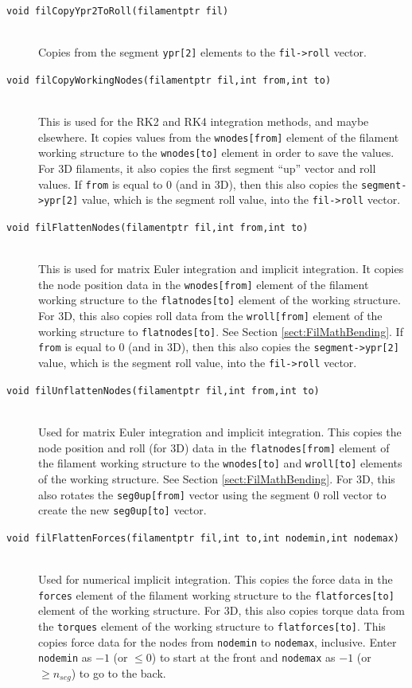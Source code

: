 \documentclass {scrbook}
\newcommand {\ttt} {\texttt}
\begin{document}
\begin{description}
\item[\ttt{void filCopyYpr2ToRoll(filamentptr fil)}]
\hfill \\
Copies from the segment \ttt{ypr[2]} elements to the \ttt{fil->roll} vector.


\item[\ttt{void filCopyWorkingNodes(filamentptr fil,int from,int to)}]
\hfill \\
This is used for the RK2 and RK4 integration methods, and maybe elsewhere. It copies values from the \ttt{wnodes[from]} element of the filament working structure to the \ttt{wnodes[to]} element in order to save the values. For 3D filaments, it also copies the first segment ``up'' vector and roll values. If \ttt{from} is equal to 0 (and in 3D), then this also copies the \ttt{segment->ypr[2]} value, which is the segment roll value, into the \ttt{fil->roll} vector.

\item[\ttt{void filFlattenNodes(filamentptr fil,int from,int to)}]
\hfill \\
This is used for matrix Euler integration and implicit integration. It copies the node position data in the \ttt{wnodes[from]} element of the filament working structure to the \ttt{flatnodes[to]} element of the working structure. For 3D, this also copies roll data from the \ttt{wroll[from]} element of the working structure to \ttt{flatnodes[to]}. See Section \ref{sect:FilMathBending}. If \ttt{from} is equal to 0 (and in 3D), then this also copies the \ttt{segment->ypr[2]} value, which is the segment roll value, into the \ttt{fil->roll} vector.

\item[\ttt{void filUnflattenNodes(filamentptr fil,int from,int to)}]
\hfill \\
Used for matrix Euler integration and implicit integration. This copies the node position and roll (for 3D) data in the \ttt{flatnodes[from]} element of the filament working structure to the \ttt{wnodes[to]} and \ttt{wroll[to]} elements of the working structure. See Section \ref{sect:FilMathBending}. For 3D, this also rotates the \ttt{seg0up[from]} vector using the segment 0 roll vector to create the new \ttt{seg0up[to]} vector.

\item[\ttt{void filFlattenForces(filamentptr fil,int to,int nodemin,int nodemax)}]
\hfill \\
Used for numerical implicit integration. This copies the force data in the \ttt{forces} element of the filament working structure to the \ttt{flatforces[to]} element of the working structure. For 3D, this also copies torque data from the \ttt{torques} element of the working structure to \ttt{flatforces[to]}. This copies force data for the nodes from \ttt{nodemin} to \ttt{nodemax}, inclusive. Enter \ttt{nodemin} as $-1$ (or $\leq 0$) to start at the front and \ttt{nodemax} as $-1$ (or $\geq n_{seg}$) to go to the back.



\end{description}
\end{document}
